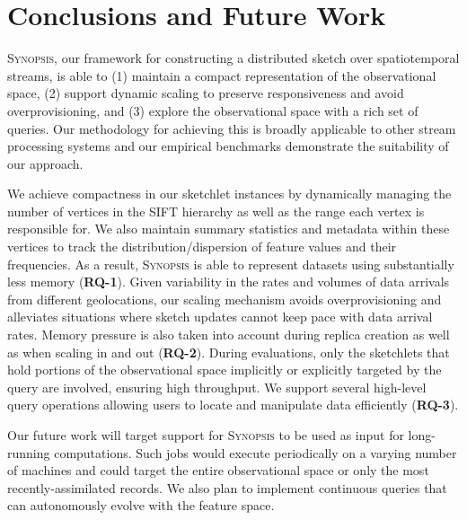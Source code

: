 \section{Conclusions and Future Work}
\label{sec:conclusions}
\textsc{Synopsis}, our framework for constructing a distributed sketch over spatiotemporal streams, is able to (1) maintain a compact representation of the observational space, (2) support dynamic scaling to preserve responsiveness and avoid overprovisioning, and (3) explore the observational space with a rich set of queries. Our methodology for achieving this is broadly applicable to other stream processing systems and our empirical benchmarks demonstrate the suitability of our approach.

We achieve compactness in our sketchlet instances by dynamically managing the number of vertices in the SIFT hierarchy as well as the range each vertex is responsible for. We also maintain summary statistics and metadata within these vertices to track the distribution/dispersion of feature values and their frequencies. As a result, \textsc{Synopsis} is able to represent datasets using substantially less memory (\textbf{RQ-1}). Given variability in the rates and volumes of data arrivals from different geolocations, our scaling mechanism avoids overprovisioning and alleviates situations where sketch updates cannot keep pace with data arrival rates. Memory pressure is also taken into account during replica creation as well as when scaling in and out (\textbf{RQ-2}). During evaluations, only the sketchlets that hold portions of the observational space implicitly or explicitly targeted by the query are involved, ensuring high throughput. We support several high-level query operations allowing users to locate and manipulate data efficiently (\textbf{RQ-3}).

Our future work will target support for \textsc{Synopsis} to be used as input for long-running computations. Such jobs would execute periodically on a varying number of machines and could target the entire observational space or only the most recently-assimilated records. We also plan to implement continuous queries that can autonomously evolve with the feature space.
